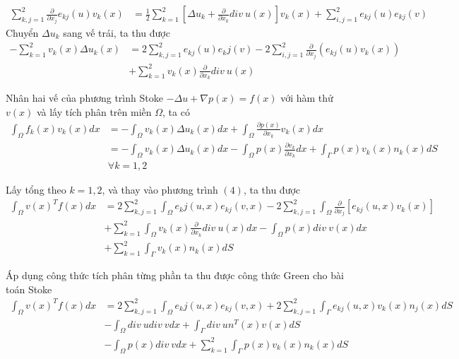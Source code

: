 \documentclass[14pt]{extreport}
\begin{document}
{\begin{equation}
\begin{split}
\sum_{k,j=1}^{2} \frac{\partial}{\partial x_j} e_{kj}(u) v_k(x) & = \frac{1}{2} \sum_{k=1}^2 \left[ \Delta u_k + \frac{\partial}{\partial x_k} div \ u(x) \right] v_k(x) + \sum_{i, j=1}^2 e_{kj}(u) e_{kj}(v)
\end{split}
\end{equation}
Chuyển $\Delta u_k$ sang vế trái, ta thu được
\begin{equation} \label{eq4}
\begin{split}
- \sum_{k=1}^2 v_k(x) \Delta u_k(x) & = 2 \sum_{k,j=1}^2 e_{kj}(u) e_kj(v) - 2\sum_{i,j=1}^2 \frac{\partial}{\partial x_j} (e_{kj}(u) v_k(x)) \\
& + \sum_{k=1}^2 v_k(x) \frac{\partial}{\partial x_k} div \ u(x)
\end{split}
\end{equation}

Nhân hai vế của phương trình Stoke $- \Delta u + \nabla p(x) = f(x)$ với hàm thử $v(x)$ và lấy tích phân trên miền $\Omega$, ta có
\begin{equation} \label{eq5}
\begin{split}
\int_{\Omega} f_k(x) v_k(x) dx & = - \int_{\Omega} v_k(x) \Delta u_k(x) dx + \int_{\Omega} \frac{\partial p(x)}{\partial x_k} v_k(x) dx \\
 & = - \int_{\Omega} v_k(x) \Delta u_k(x) dx - \int_{\Omega} p(x) \frac{\partial v_k}{\partial x_k} dx + \int_{\Gamma} p(x) v_k(x) n_k(x) dS  \\
& \forall k = 1,2
\end{split}
\end{equation}

Lấy tổng theo $k = 1,2$, và thay vào phương trình $(4)$, ta thu được
\begin{equation} \label{eq6}
\begin{split}
\int_{\Omega} v(x)^T f(x) dx & = 2 \sum_{k, j = 1}^2 \int_{\Omega} e_kj(u, x) e_{kj} (v,x) - 2 \sum_{k,j=1}^2 \int_{\Omega} \frac{\partial}{\partial x_j} \left[ e_{kj}(u, x) v_k(x) \right] \\
& + \sum_{k=1}^2 \int_{\Omega} v_k(x) \frac{\partial}{\partial x_k} div \ u(x) dx - \int_{\Omega} p(x) div \ v(x) dx \\
& + \sum_{k =1}^2 \int_{\Gamma} v_k(x) n_k(x) dS 
\end{split}
\end{equation}

Áp dụng công thức tích phân từng phần ta thu được công thức Green cho bài toán Stoke
\begin{equation} \label{eq7}
\begin{split}
\int_{\Omega} v(x)^T f(x) dx & = 2 \sum_{k, j = 1}^2 \int_{\Omega} e_kj(u, x) e_{kj} (v,x) + 2 \sum_{k,j=1}^2 \int_{\Gamma} e_{kj}(u, x) v_k(x) n_j(x) dS \\
& - \int_{\Omega} div \ u div \ v dx + \int_{\Gamma} div \ u n^T(x) v(x) dS \\
& - \int_{\Omega} p(x) div \ v dx + \sum_{k =1}^2 \int_{\Gamma} p(x) v_k(x) n_k(x) dS 
\end{split}
\end{equation}

}
\end{document}
